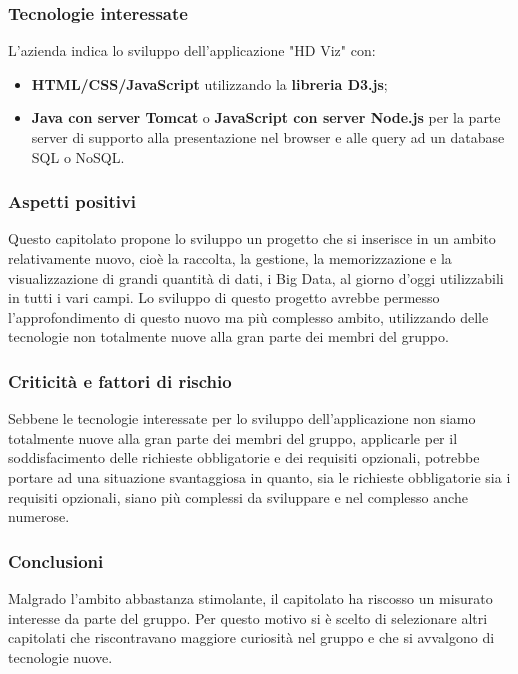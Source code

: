 \subsubsection{Tecnologie interessate}
L'azienda indica lo sviluppo dell'applicazione "HD Viz" con:
\begin{itemize}
\item \textbf{HTML/CSS/JavaScript} utilizzando la \textbf{libreria D3.js};
\item \textbf{Java con server Tomcat} o \textbf{JavaScript con server Node.js} per la parte server di supporto alla presentazione nel browser e alle query ad un database SQL o NoSQL.
\end{itemize}
\subsubsection{Aspetti positivi}
Questo capitolato propone lo sviluppo un progetto che si inserisce in un ambito relativamente nuovo, cioè la raccolta, la gestione, la memorizzazione e la visualizzazione di grandi quantità di dati, i Big Data, al giorno d'oggi utilizzabili in tutti i vari campi.
Lo sviluppo di questo progetto avrebbe permesso l'approfondimento di questo nuovo ma più complesso ambito, utilizzando delle tecnologie non totalmente nuove alla gran parte dei membri del gruppo.
\subsubsection{Criticità e fattori di rischio}
Sebbene le tecnologie interessate per lo sviluppo dell'applicazione non siamo totalmente nuove alla gran parte dei membri del gruppo, applicarle per il soddisfacimento delle richieste obbligatorie e dei requisiti opzionali, potrebbe portare ad una situazione svantaggiosa in quanto, sia le richieste obbligatorie sia i requisiti opzionali, siano più complessi da sviluppare e nel complesso anche numerose.
\subsubsection{Conclusioni}
Malgrado l'ambito abbastanza stimolante, il capitolato ha riscosso un misurato interesse da parte del gruppo.
Per questo motivo si è scelto di selezionare altri capitolati che riscontravano maggiore curiosità nel gruppo e che si avvalgono di tecnologie nuove.